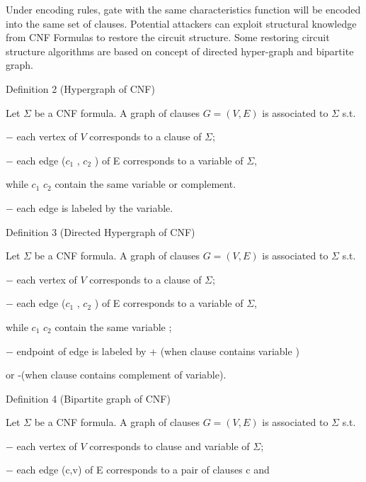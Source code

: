 \documentclass[runningheads,a4paper]{llncs}
\begin{document}
Under encoding rules, gate with the same characteristics function will be encoded into the same set of clauses. 
Potential attackers can exploit structural knowledge from CNF Formulas to restore the circuit structure. 
Some restoring circuit structure algorithms are based on concept of directed hyper-graph and bipartite graph.	

\noindent \newline Definition 2 (Hypergraph of CNF)

\setlength{\parindent}{1em} Let $\Sigma$ be a CNF formula. A graph of clauses $G=(V,E)$ is associated to $\Sigma$ s.t.

\setlength{\parindent}{4em}  $-$ each vertex of $V$ corresponds to a clause of  $\Sigma$;

\setlength{\parindent}{4em}  $-$ each edge ($c_1$ , $c_2$ ) of E corresponds to a variable of $\Sigma$, 

\setlength{\parindent}{5em} while $c_1$ $c_2$ contain the same variable or complement.

\setlength{\parindent}{4em}  $-$ each edge is labeled by the variable.
 
\noindent \newline Definition 3 (Directed Hypergraph of CNF)

\setlength{\parindent}{1em} Let $\Sigma$ be a CNF formula. A graph of clauses $G=(V,E)$ is associated to $\Sigma$ s.t.

\setlength{\parindent}{4em} $-$ each vertex of $V$ corresponds to a clause of $\Sigma$;

\setlength{\parindent}{4em} $-$ each edge ($c_1$ , $c_2$ ) of E corresponds to a variable of $\Sigma$,

\setlength{\parindent}{5em} while $c_1$ $c_2$ contain the same variable ;

\setlength{\parindent}{4em} $-$ endpoint of edge is labeled by + (when clause contains variable ) 

\setlength{\parindent}{5em} or -(when clause contains complement of variable).

\noindent \newline Definition 4 (Bipartite graph of CNF)

\setlength{\parindent}{1em} Let $\Sigma$ be a CNF formula. A graph of clauses $G=(V,E)$ is associated to $\Sigma$ s.t.

\setlength{\parindent}{4em} $-$ each vertex of $V$ corresponds to clause and variable of $\Sigma$;

\setlength{\parindent}{4em} $-$ each edge (c,v) of E corresponds to a pair of clauses c and
\end{document}
